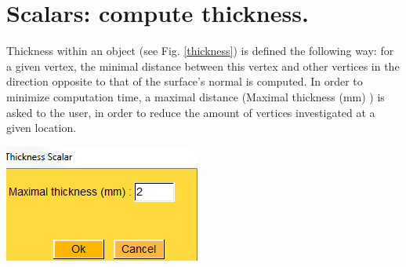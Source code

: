 \section{Scalars: compute thickness.}
\noindent
\begin{minipage}{0.5\textwidth}
Thickness within an object (see Fig. \ref{thickness}) is defined the following way: for a
given vertex, the minimal distance between this vertex and other
vertices in the direction opposite to that of the surface's normal
is computed. In order to minimize computation time, a maximal
distance (Maximal thickness (mm) ) is asked to the user, in order
to reduce the amount of vertices investigated at a given location.
\end{minipage}    
\begin{minipage}{0.5\textwidth}\centering
  \includegraphics[scale=0.5]{images/Scalars_renreding/Thickness_window.png}
\label{thickness_window}
 \end{minipage} 
\noindent





